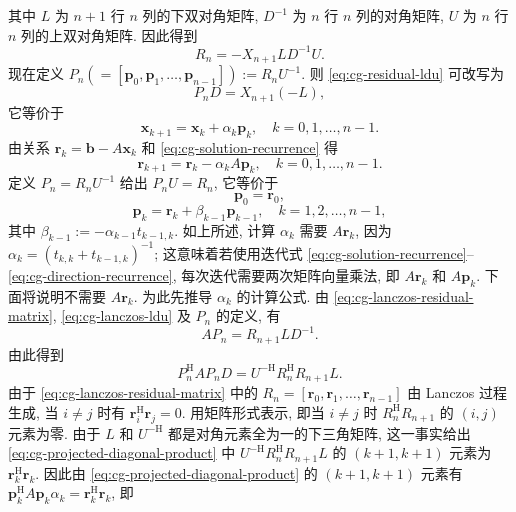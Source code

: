 {其中 $L$ 为 $n+1$ 行 $n$ 列的下双对角矩阵, $D^{-1}$ 为 $n$ 行 $n$ 列的对角矩阵, $U$ 为 $n$ 行 $n$ 列的上双对角矩阵. 因此得到}
\begin{equation}\label{eq:cg-residual-ldu}R_n=-X_{n+1}LD^{-1}U.\end{equation}
{现在定义 $P_n(=[\bm p_0,\bm p_1,\ldots,\bm p_{n-1}]):=R_nU^{-1}$. 则 \eqref{eq:cg-residual-ldu} 可改写为}
\begin{equation}\label{eq:cg-direction-matrix}P_nD=X_{n+1}(-L),\end{equation}
{它等价于}
\begin{equation}\label{eq:cg-solution-recurrence}\bm x_{k+1}=\bm x_k+\alpha_k\bm p_k,\quad k=0,1,\ldots,n-1.\end{equation}
{由关系 $\bm r_k=\bm b-A\bm x_k$ 和 \eqref{eq:cg-solution-recurrence} 得}
\begin{equation}\label{eq:cg-residual-recurrence}\bm r_{k+1}=\bm r_k-\alpha_kA\bm p_k,\quad k=0,1,\ldots,n-1.\end{equation}
{定义 $P_n=R_nU^{-1}$ 给出 $P_nU=R_n$, 它等价于}
\begin{equation}\label{eq:cg-initial-direction}\bm p_0=\bm r_0,\end{equation}
\begin{equation}\label{eq:cg-direction-recurrence}\bm p_k=\bm r_k+\beta_{k-1}\bm p_{k-1},\quad k=1,2,\ldots,n-1,\end{equation}
{其中 $\beta_{k-1}:=-\alpha_{k-1}t_{k-1,k}$. 如上所述, 计算 $\alpha_k$ 需要 $A\bm r_k$, 因为 $\alpha_k=(t_{k,k}+t_{k-1,k})^{-1}$; 这意味着若使用迭代式 \eqref{eq:cg-solution-recurrence}--\eqref{eq:cg-direction-recurrence}, 每次迭代需要两次矩阵向量乘法, 即 $A\bm r_k$ 和 $A\bm p_k$. 下面将说明不需要 $A\bm r_k$. 为此先推导 $\alpha_k$ 的计算公式.}
{由 \eqref{eq:cg-lanczos-residual-matrix}, \eqref{eq:cg-lanczos-ldu} 及 $P_n$ 的定义, 有}
\[AP_n=R_{n+1}LD^{-1}.\]
{由此得到}
\begin{equation}\label{eq:cg-projected-diagonal-product}P_n^{\mathrm H}AP_nD=U^{-\mathrm H}R_n^{\mathrm H}R_{n+1}L.\end{equation}
{由于 \eqref{eq:cg-lanczos-residual-matrix} 中的 $R_n=[\bm r_0,\bm r_1,\ldots,\bm r_{n-1}]$ 由 Lanczos 过程生成, 当 $i\ne j$ 时有 $\bm r_i^{\mathrm H}\bm r_j=0$. 用矩阵形式表示, 即当 $i\ne j$ 时 $R_n^{\mathrm H}R_{n+1}$ 的 $(i,j)$ 元素为零. 由于 $L$ 和 $U^{-\mathrm H}$ 都是对角元素全为一的下三角矩阵, 这一事实给出 \eqref{eq:cg-projected-diagonal-product} 中 $U^{-\mathrm H}R_n^{\mathrm H}R_{n+1}L$ 的 $(k+1,k+1)$ 元素为 $\bm r_k^{\mathrm H}\bm r_k$. 因此由 \eqref{eq:cg-projected-diagonal-product} 的 $(k+1,k+1)$ 元素有 $\bm p_k^{\mathrm H}A\bm p_k\alpha_k=\bm r_k^{\mathrm H}\bm r_k$, 即}
